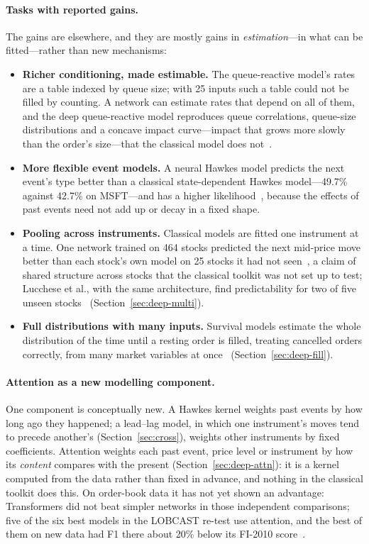 \paragraph{Tasks with reported gains.} The gains are elsewhere, and they are mostly
gains in \emph{estimation}---in what can be fitted---rather than new mechanisms:
\begin{itemize}[leftmargin=1.5em,itemsep=1pt]
\item \textbf{Richer conditioning, made estimable.} The queue-reactive model's rates are a table indexed by
  queue size; with 25 inputs such a table could not be filled by counting. A network can estimate rates that
  depend on all of them, and the deep queue-reactive model reproduces queue correlations, queue-size
  distributions and a concave impact curve---impact that grows more slowly than the order's size---that the classical
model does not~\citep{deepqr}.
\item \textbf{More flexible event models.} A neural Hawkes model predicts the next event's type better than a
  classical state-dependent Hawkes model---49.7\% against 42.7\% on MSFT---and has a higher
  likelihood~\citep{shi2022sdpnhp}, because the effects of past events need not add up or decay in a fixed
  shape.
\item \textbf{Pooling across instruments.} Classical models are fitted one instrument at a time. One network
  trained on 464 stocks predicted the next mid-price move better than each stock's own model on 25 stocks it
  had not seen~\citep{sirignano2019}, a claim of shared structure across stocks that the classical toolkit was
  not set up to test; Lucchese et al., with the same architecture, find predictability for two of five unseen
  stocks~\citep{lucchese2024}
  (Section~\ref{sec:deep-multi}).
\item \textbf{Full distributions with many inputs.} Survival models estimate the whole distribution of the time
  until a resting order is filled, treating cancelled orders correctly, from many market variables at
  once~\citep{arroyo2024,kanformer} (Section~\ref{sec:deep-fill}).
\end{itemize}

\paragraph{Attention as a new modelling component.} One component is conceptually new.
A Hawkes kernel weights past events by how long ago they happened; a lead--lag model, in which one instrument's moves tend to precede another's
(Section~\ref{sec:cross}), weights other instruments by fixed coefficients. Attention weights each past event, price level or instrument by how its \emph{content}
compares with the present (Section~\ref{sec:deep-attn}): it is a kernel computed from the data rather than
fixed in advance, and nothing in the classical toolkit does this. On order-book data it has not yet shown an
advantage: Transformers did not beat simpler networks in those independent comparisons; five of the six
best models in the LOBCAST re-test use attention, and the best of them on new data had F1 there about 20\% below its
FI-2010 score~\citep{prata2024}.

